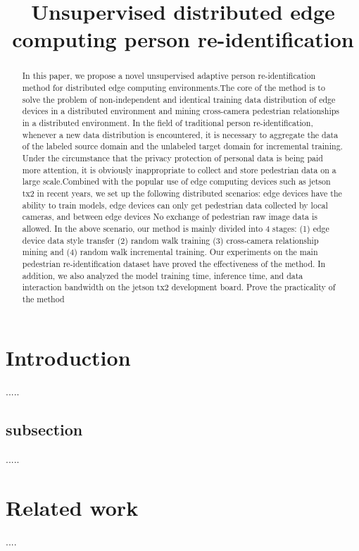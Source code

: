 \documentclass{article}
\title{Unsupervised distributed edge computing person re-identification}
\begin{document}
\maketitle

\begin{abstract}
    In this paper,  we propose a novel unsupervised adaptive person re-identification method for distributed edge computing environments.The core of the method is to solve the problem of non-independent and identical training data distribution of edge devices in a distributed environment and mining cross-camera pedestrian relationships in a distributed environment.
    In the field of traditional person re-identification, whenever a new data distribution is encountered, it is necessary to aggregate the data of the labeled source domain and the unlabeled target domain for incremental training.  Under the circumstance that the privacy protection of personal data is being paid more  attention, it is obviously inappropriate to collect and store pedestrian data on a large scale.Combined with the popular use of edge computing devices such as jetson tx2 in recent years, we set up the following distributed scenarios: edge devices have the ability to train models, edge devices can only get pedestrian data collected by local cameras, and between edge devices No exchange of pedestrian raw image data is allowed.
    In the above scenario, our method is mainly divided into 4 stages: (1) edge device data style transfer (2) random walk training (3) cross-camera relationship mining and (4) random walk incremental training.
    Our experiments on the main pedestrian re-identification dataset have proved the effectiveness of the method. In addition, we also analyzed the model training time, inference time, and data interaction bandwidth on the jetson tx2 development board. Prove the practicality of the method
    
\end{abstract}

\section{Introduction}
.....

\subsection{subsection}
.....

\section{Related work}
....
\end{document}
